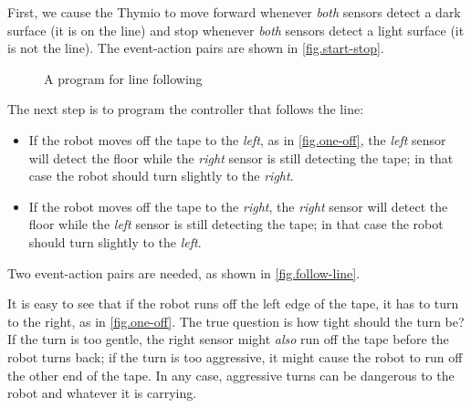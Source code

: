 First, we cause the Thymio to move forward whenever \emph{both} sensors detect
a dark surface (it is on the line) and stop whenever \emph{both} sensors detect a
light surface (it is not the line).
The event-action pairs are shown in \cref{fig.start-stop}.



\begin{figure}
	\hfill
	\caption{A program for line following}
\end{figure}


The next step is to program the controller that follows the line:
\begin{itemize}

\item If the robot moves off the tape to the \emph{left}, as in \cref{fig.one-off}, the
\emph{left} sensor will detect the floor while the \emph{right} sensor
is still detecting the tape; in that case the robot should turn slightly
to the \emph{right}.

\item If the robot moves off the tape to the \emph{right}, the
\emph{right} sensor will detect the floor while the \emph{left}
sensor is still detecting the tape; in that case the robot should turn
slightly to the \emph{left}.

\end{itemize}

Two event-action pairs are needed, as shown in \cref{fig.follow-line}.


It is easy to see that if the robot runs off the left edge of the tape, it has to turn to the right, as in \cref{fig.one-off}.
The true question is how tight should the turn be?
If the turn is too gentle, the right
sensor might \emph{also} run off the tape before the robot turns back;
if the turn is too aggressive, it might cause the robot to run off the
other end of the tape. In any case, aggressive turns can be dangerous to
the robot and whatever it is carrying.

